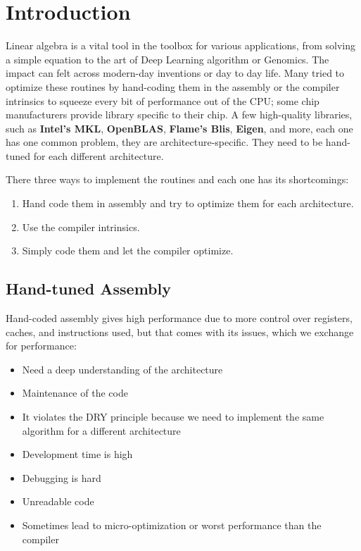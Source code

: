 \chapter{Introduction}

Linear algebra is a vital tool in the toolbox for various applications, 
from solving a simple equation to the art of Deep Learning algorithm or 
Genomics. The impact can felt across modern-day inventions or day to day 
life. Many tried to optimize these routines by hand-coding them in the assembly 
or the compiler intrinsics to squeeze every bit of performance out of the CPU; 
some chip manufacturers provide library specific to their chip. A few high-quality 
libraries, such as \textbf{Intel's MKL}, \textbf{OpenBLAS}, \textbf{Flame's Blis}, 
\textbf{Eigen}, and more, each one has one common problem, 
they are architecture-specific. They need to be hand-tuned for each different architecture.

There three ways to implement the routines and each one has its shortcomings:
\begin{enumerate}
    \item Hand code them in assembly and try to optimize them for each architecture.
    \item Use the compiler intrinsics.
    \item Simply code them and let the compiler optimize.
\end{enumerate}

\section{Hand-tuned Assembly}

Hand-coded assembly gives high performance due to more control over registers, 
caches, and instructions used, but that comes with its issues, 
which we exchange for performance:

\begin{itemize}
    \item Need a deep understanding of the architecture
    \item Maintenance of the code
    \item It violates the DRY principle because we need to implement 
        the same algorithm for a different architecture
    \item Development time is high
    \item Debugging is hard
    \item Unreadable code
    \item Sometimes lead to micro-optimization or worst performance than the compiler
\end{itemize}

